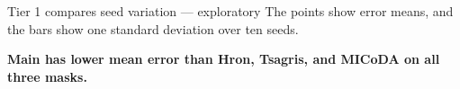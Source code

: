 \begin{frame}{Tier 1 compares seed variation --- exploratory}
\fontsize{9}{11}\selectfont
The points show error means, and the bars show one standard deviation over ten seeds.
\par\medskip
{}
\par\medskip
\textbf{Main has lower mean error than Hron, Tsagris, and MICoDA on all three masks.}
\end{frame}
